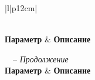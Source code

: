 \begin{longtable}{|l|p{12cm}|}
	\caption{Подробное описание параметров солнечной и геомагнитной активности}
	\label{tab:detailed_solar_geo_params}                                                                                                                                                                                                                                                                                                                                                                                                                                                                                                    \\

	\hline
	\textbf{Параметр}     & \textbf{Описание}                                                                                                                                                                                                                                                                                                                                                                                                                                                                                                \\
	\hline
	\endfirsthead

	{\tablename\ \thetable\ -- \textit{Продолжение}}                                                                                                                                                                                                                                                                                                                                                                                                                                                                                         \\
	\hline
	\textbf{Параметр}     & \textbf{Описание}                                                                                                                                                                                                                                                                                                                                                                                                                                                                                                \\
	\hline
	\endhead


\end{longtable}
